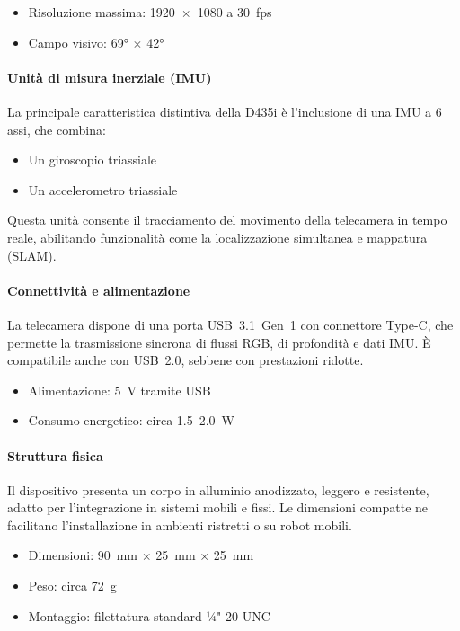 \documentclass[11pt]{report}
\begin{document}
\begin{itemize}
  \item Risoluzione massima: 1920~$\times$~1080 a 30~fps
  \item Campo visivo: 69° $\times$ 42°
\end{itemize}

\paragraph{Unità di misura inerziale (IMU)}  
La principale caratteristica distintiva della D435i è l’inclusione di una IMU a 6 assi, che combina:

\begin{itemize}
  \item Un giroscopio triassiale
  \item Un accelerometro triassiale
\end{itemize}

Questa unità consente il tracciamento del movimento della telecamera in tempo reale, abilitando funzionalità come la localizzazione simultanea e mappatura (SLAM).

\paragraph{Connettività e alimentazione}  
La telecamera dispone di una porta USB~3.1~Gen~1 con connettore Type-C, che permette la trasmissione sincrona di flussi RGB, di profondità e dati IMU. È compatibile anche con USB~2.0, sebbene con prestazioni ridotte.

\begin{itemize}
  \item Alimentazione: 5~V tramite USB
  \item Consumo energetico: circa 1.5–2.0~W
\end{itemize}

\paragraph{Struttura fisica}  
Il dispositivo presenta un corpo in alluminio anodizzato, leggero e resistente, adatto per l'integrazione in sistemi mobili e fissi. Le dimensioni compatte ne facilitano l'installazione in ambienti ristretti o su robot mobili.

\begin{itemize}
  \item Dimensioni: 90~mm $\times$ 25~mm $\times$ 25~mm
  \item Peso: circa 72~g
  \item Montaggio: filettatura standard ¼"-20 UNC
\end{itemize}
\end{document}
